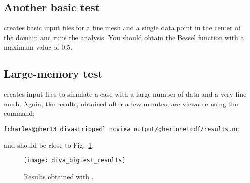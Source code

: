 \subsection{Another basic test}

 creates basic input files for a fine mesh and a single data point in the center of the domain and runs the analysis. You should obtain the  Bessel function with a maximum value of 0.5.


\subsection{Large-memory test}

 creates input files to simulate a case with a large number of data and a very fine mesh. Again, the results, obtained after a few minutes, are viewable using the command:
\begin{lstlisting}[style=Bash]
[charles@gher13 divastripped] ncview output/ghertonetcdf/results.nc
\end{lstlisting}
and should be close to Fig.~\ref{fig:diva_bigtest_results}.

\begin{figure}[H]
\centering 
\texttt{[image: diva\_bigtest\_results]}
\caption{Results obtained with .\label{fig:diva_bigtest_results}}
\end{figure}




